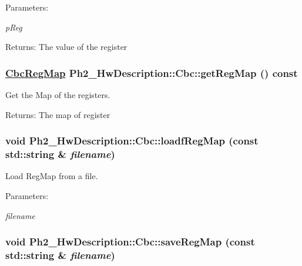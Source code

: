 \begin{Desc}
\item[Parameters:]
\begin{description}
\item[{\em p\-Reg}]\end{description}
\end{Desc}
\begin{Desc}
\item[Returns:]The value of the register \end{Desc}
\hypertarget{class_ph2___hw_description_1_1_cbc_0aa8665c692683ff2317f80ed1c343c2}{
\subsubsection[getRegMap]{\setlength{\rightskip}{0pt plus 5cm}\hyperlink{namespace_ph2___hw_description_9a23b373068f169aa67ca1d22c9a6001}{Cbc\-Reg\-Map} Ph2\_\-Hw\-Description::Cbc::get\-Reg\-Map () const}}
\label{class_ph2___hw_description_1_1_cbc_0aa8665c692683ff2317f80ed1c343c2}


Get the Map of the registers. 

\begin{Desc}
\item[Returns:]The map of register \end{Desc}
\hypertarget{class_ph2___hw_description_1_1_cbc_8cde19bba99aebac03f0ed86b96295e9}{
\subsubsection[loadfRegMap]{\setlength{\rightskip}{0pt plus 5cm}void Ph2\_\-Hw\-Description::Cbc::loadf\-Reg\-Map (const std::string \& {\em filename})}}
\label{class_ph2___hw_description_1_1_cbc_8cde19bba99aebac03f0ed86b96295e9}


Load Reg\-Map from a file. 

\begin{Desc}
\item[Parameters:]
\begin{description}
\item[{\em filename}]\end{description}
\end{Desc}
\hypertarget{class_ph2___hw_description_1_1_cbc_1aa56daeee44f8ac84ebb23c0b5828cb}{
\subsubsection[saveRegMap]{\setlength{\rightskip}{0pt plus 5cm}void Ph2\_\-Hw\-Description::Cbc::save\-Reg\-Map (const std::string \& {\em filename})}}
\label{class_ph2___hw_description_1_1_cbc_1aa56daeee44f8ac84ebb23c0b5828cb}


